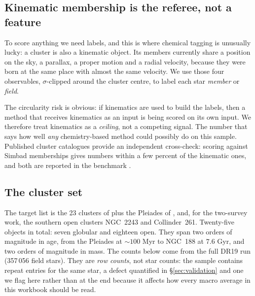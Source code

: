 \subsection{Kinematic membership is the referee, not a feature}
\label{sec:kinematics}

To score anything we need labels, and this is where chemical tagging is
unusually lucky: a cluster is also a kinematic object. Its members currently
share a position on the sky, a parallax, a proper motion and a radial
velocity, because they were born at the same place with almost the same
velocity. We use those four observables, $\sigma$-clipped around the cluster
centre, to label each star \emph{member} or \emph{field}.

The circularity risk is obvious: if kinematics are used to build the labels,
then a method that receives kinematics as an input is being scored on its own
input. We therefore treat kinematics as a \emph{ceiling}, not a competing
signal. The number that says how well \emph{any} chemistry-based method could
possibly do on this sample. Published cluster catalogues provide an independent
cross-check: scoring against Simbad memberships gives numbers within a few
percent of the kinematic ones, and both are reported in the benchmark
\citep{Dias:02, Harris:96}.

\subsection{The cluster set}
\label{sec:clusters}

The target list is the 23 clusters of \citet{GarciaDias:19} plus the Pleiades
of \citet{Kos:17}, and, for the two-survey work, the southern open clusters
NGC~2243 and Collinder~261. Twenty-five objects in total: seven globular and
eighteen open. They span two orders of magnitude in age, from the Pleiades at
$\sim\!100$ Myr to NGC~188 at $7.6$ Gyr, and two orders of magnitude in mass.
The counts below come from the full DR19 run (357\,056 field stars). They are
\emph{row counts}, not star counts: the sample contains repeat entries for the
same star, a defect quantified in \S\ref{sec:validation} and one we flag here
rather than at the end because it affects how every macro average in this
workbook should be read.

